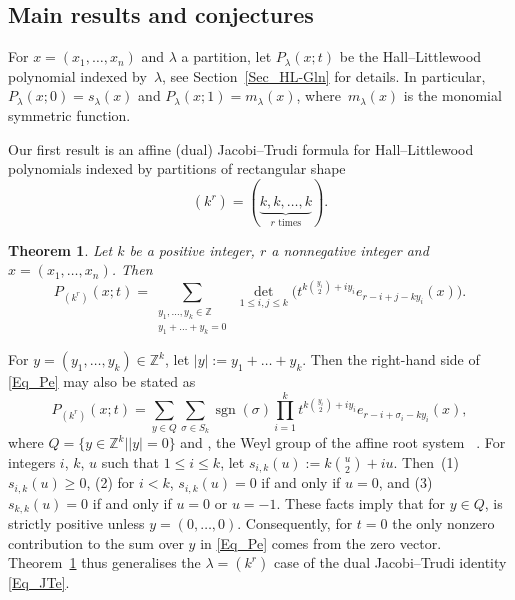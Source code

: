 \documentclass[pdftex]{sigma}
\numberwithin{equation}{section}
\newtheorem{Theorem}{Theorem}[section]
\renewcommand{\leq}{\leqslant}
\renewcommand{\geq}{\geqslant}
\DeclareMathOperator{\sgn}{sgn}
\newcommand{\abs}[1]{\vert#1\vert}
\newcommand{\la}{\lambda}
\begin{document}

\subsection{Main results and conjectures}

For $x=(x_1,\dots,x_n)$ and $\la$ a partition,
let $P_{\la}(x;t)$ be the Hall--Littlewood polynomial indexed by~$\la$,
see Section~\ref{Sec_HL-Gln} for details.
In particular, $P_{\la}(x;0)=s_{\la}(x)$ and $P_{\la}(x;1)=m_{\la}(x)$,
where~$m_{\la}(x)$ is the monomial symmetric function.

Our first result is an affine (dual) Jacobi--Trudi formula for
Hall--Littlewood polynomials indexed by partitions of rectangular
shape
\[
(k^r)=(\underbrace{k,k,\dots,k}_{r \text{ times}}).
\]

\begin{Theorem}\label{Thm_GLn}
Let $k$ be a positive integer, $r$ a nonnegative integer and
$x=(x_1,\dots,x_n)$.
Then
\begin{equation}\label{Eq_Pe}
P_{(k^r)}(x;t)=
\sum_{\substack{y_1,\dots,y_k\in\mathbb{Z}\\[1pt] y_1+\dots+y_k=0}}\:
\det_{1\leq i,j\leq k}
\bigl(t^{k\binom{y_i}{2}+iy_i} e_{r-i+j-ky_i}(x) \bigr).
\end{equation}
\end{Theorem}

For $y=(y_1,\dots,y_k)\in\mathbb{Z}^k$, let $\abs{y}:=y_1+\dots+y_k$.
Then the right-hand side of \eqref{Eq_Pe} may also be stated as
\[
P_{(k^r)}(x;t)=
\sum_{y\in Q} \sum_{\sigma\in S_k} \sgn(\sigma) \prod_{i=1}^k
t^{k\binom{y_i}{2}+iy_i} e_{r-i+\sigma_i-ky_i}(x),
\]
where $Q=\big\{y\in\mathbb{Z}^k \mid \abs{y}=0\big\}$ and
,
the Weyl group of the affine root system~
\cite{Kac90,Macdonald72}.
For integers $i$, $k$, $u$ such that $1\leq i\leq k$, let
${s_{i,k}(u):=k\binom{u}{2}+iu}$.
Then~(1)~$s_{i,k}(u)\geq 0$, (2) for $i<k$, $s_{i,k}(u)=0$
if and only if $u=0$, and (3) $s_{k,k}(u)=0$ if and only if
$u=0$ or $u=-1$.
These facts imply that for $y\in Q$,
is strictly positive unless $y=(0,\dots,0)$.
Consequently, for $t=0$ the only nonzero contribution to the sum over
$y$ in \eqref{Eq_Pe} comes from the zero vector.
Theorem~\ref{Thm_GLn} thus generalises the $\la=(k^r)$ case of the
dual Jacobi--Trudi identity \eqref{Eq_JTe}.
\end{document}
